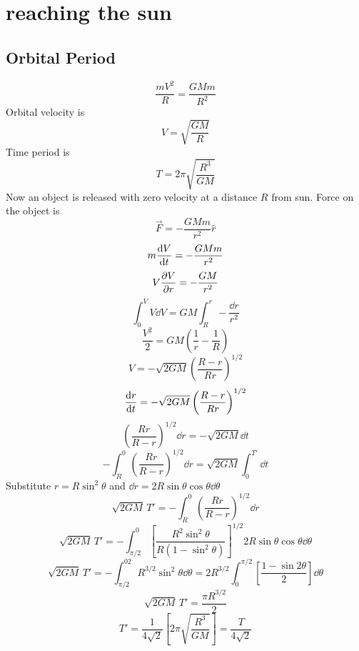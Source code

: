 \documentclass[12pt]{article}
\begin{document}
\section*{reaching the sun}
\subsection*{Orbital Period}
\[\frac{mV^2}{R}=\frac{GMm}{R^2}\]
Orbital velocity is \[V=\sqrt{\frac{GM}{R}}\]
Time period is 
\[T=2\pi\sqrt{\frac{R^3}{GM}}\]
Now an object is released with zero velocity at a distance $R$ from sun. Force on the object is \[\vec{F}=-\frac{GMm}{r^2}\hat{r}\]
\[m\dv{V}{t}=-\frac{GMm}{r^2}\]
\[V\pdv{V}{r}=-\frac{GM}{r^2}\]
\[\int_0^VV\dd{V}=GM\int_R^r-\frac{\dd{r}}{r^2}\]
\[\frac{V^2}{2}=GM\left(\frac{1}{r}-\frac{1}{R}\right)\]
\[V=-\sqrt{2GM}\left(\frac{R-r}{Rr}\right)^{1/2}\]
\[\dv{r}{t}=-\sqrt{2GM}\left(\frac{R-r}{Rr}\right)^{1/2}\]
\[\left(\frac{Rr}{R-r}\right)^{1/2}\dd{r}=-\sqrt{2GM}\dd{t}\]
\[-\int^0_R\left(\frac{Rr}{R-r}\right)^{1/2}\dd{r}=\sqrt{2GM}\int_0^{T'}\dd{t}\]
Substitute $r=R\sin^2\theta$ and $\dd{r}=2R\sin\theta\cos\theta\dd{\theta}$
\[\sqrt{2GM}\,T'=-\int_R^0\left(\frac{Rr}{R-r}\right)^{1/2}\dd{r}\]
\[\sqrt{2GM}\,T'=-\int_{\pi/2}^0\left[\frac{R^2\sin^2\theta}{R(1-\sin^2\theta)}\right]^{1/2}2R\sin\theta\cos\theta\dd{\theta}\]
\[\sqrt{2GM}\,T'=-\int_{\pi/2}^02R^{3/2}\sin^2\theta\dd{\theta}=2R^{3/2}\int_0^{\pi/2}\left[\frac{1-\sin2\theta}{2}\right]\dd{\theta}\]
\[\sqrt{2GM}\,T'=\frac{\pi R^{3/2}}{2}\]
\[T'=\frac{1}{4\sqrt{2}}\left[2\pi\sqrt{\frac{R^3}{GM}}\right]=\frac{T}{4\sqrt{2}}\]
\end{document}
